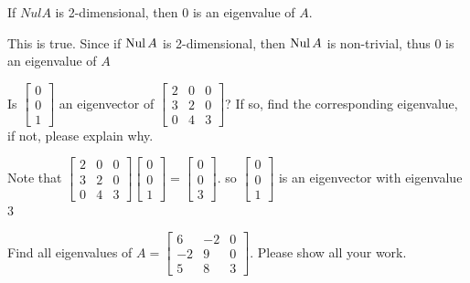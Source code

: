 \documentclass[a4paper,10pt]{article}
\begin{document}
\begin{problem}
If $Nul A$ is 2-dimensional, then $0$ is an eigenvalue of $A$.
\end{problem}

\begin{solution}
This is true. Since if $\operatorname{Nul} A$ is 2-dimensional, then $\operatorname{Nul} A$ is non-trivial, thus $0$ is an eigenvalue of $A$
\end{solution}

\begin{problem}
Is $\begin{bmatrix}0\\0\\1\end{bmatrix}$ an eigenvector of $\begin{bmatrix}2&0&0\\3&2&0\\0&4&3\end{bmatrix}$? If so, find the corresponding eigenvalue, if not, please explain why.
\end{problem}

\begin{solution}
Note that $\begin{bmatrix}2&0&0\\3&2&0\\0&4&3\end{bmatrix}\begin{bmatrix}0\\0\\1\end{bmatrix}=\begin{bmatrix}0\\0\\3\end{bmatrix}$. so $\begin{bmatrix}0\\0\\1\end{bmatrix}$ is an eigenvector with eigenvalue 3
\end{solution}

\begin{problem}
Find all eigenvalues of $A=\begin{bmatrix}6&-2&0\\-2&9&0\\5&8&3\end{bmatrix}$. Please show all your work.
\end{problem}
\end{document}
